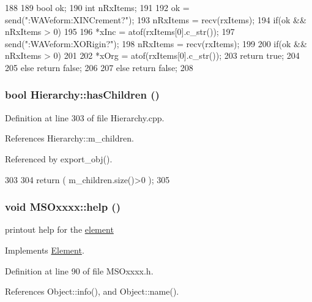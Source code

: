 \begin{DoxyCode}
188 {
189     bool ok;
190     int nRxItems;
191 
192     ok = send(":WAVeform:XINCrement?\n");
193     nRxItems = recv(rxItems);
194     if(ok && nRxItems > 0)
195     {
196         *xInc = atof(rxItems[0].c_str());
197         send(":WAVeform:XORigin?\n");       
198         nRxItems = recv(rxItems);
199 
200         if(ok && nRxItems > 0)
201         {
202             *xOrg = atof(rxItems[0].c_str());
203             return true;
204         }
205         else return false;
206     }
207     else return false;
208 }
\end{DoxyCode}
\hypertarget{classHierarchy_a255174fe4d316d2a3f430dcb9dab29f1}{
\subsubsection[{hasChildren}]{\setlength{\rightskip}{0pt plus 5cm}bool Hierarchy::hasChildren ()}}
\label{classHierarchy_a255174fe4d316d2a3f430dcb9dab29f1}


Definition at line 303 of file Hierarchy.cpp.

References Hierarchy::m\_\-children.

Referenced by export\_\-obj().


\begin{DoxyCode}
303                               {
304   return ( m_children.size()>0 );
305 }
\end{DoxyCode}
\hypertarget{classMSOxxxx_a8c22ff23297ada963eaf12b6e0b62017}{
\subsubsection[{help}]{\setlength{\rightskip}{0pt plus 5cm}void MSOxxxx::help ()}}
\label{classMSOxxxx_a8c22ff23297ada963eaf12b6e0b62017}
printout help for the \hyperlink{namespaceelement}{element} 

Implements \hyperlink{classElement_a32c0de27acb08e17251cef88c3e9303a}{Element}.

Definition at line 90 of file MSOxxxx.h.

References Object::info(), and Object::name().


